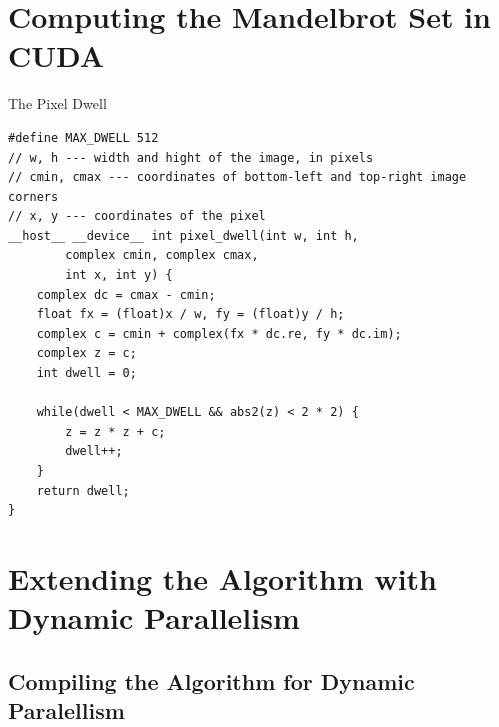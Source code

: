 \documentclass[fleqn,11pt,aspectratio=43]{beamer}
\begin{document}
\section{Computing the Mandelbrot Set in CUDA}

\begin{frame}[fragile]{The Pixel Dwell}
	\begin{lstlisting}
#define MAX_DWELL 512
// w, h --- width and hight of the image, in pixels
// cmin, cmax --- coordinates of bottom-left and top-right image corners
// x, y --- coordinates of the pixel
__host__ __device__ int pixel_dwell(int w, int h, 
		complex cmin, complex cmax, 
		int x, int y) {
	complex dc = cmax - cmin;
	float fx = (float)x / w, fy = (float)y / h;
	complex c = cmin + complex(fx * dc.re, fy * dc.im);
	complex z = c; 
	int dwell = 0;

	while(dwell < MAX_DWELL && abs2(z) < 2 * 2) { 
		z = z * z + c;
		dwell++;
	}
	return dwell;
}
	\end{lstlisting}
\end{frame}

\section{Extending the Algorithm with Dynamic Parallelism}

\subsection{Compiling the Algorithm for Dynamic Paralellism}
\end{document}
